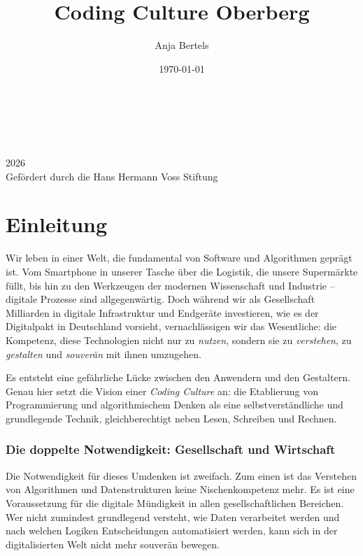 \documentclass[a5paper,pagesize,10pt,bibtotoc,pointlessnumbers,
normalheadings,DIV=9,twoside=false]{scrbook}
\title{Coding Culture Oberberg}
\author{Anja Bertels}
\date{\today}
\begin{document}
\begin{titlepage}
		\\
			
		\vspace{10mm}
		\\
        \\
		\vspace{\fill}
		\centering \large{2026}\\
        \centering \small{Gefördert durch die Hans Hermann Voss Stiftung}
\end{titlepage}


\newpage{}

\chapter{Einleitung}

Wir leben in einer Welt, die fundamental von Software und Algorithmen geprägt ist. Vom Smartphone in unserer Tasche über die Logistik, die unsere Supermärkte füllt, bis hin zu den Werkzeugen der modernen Wissenschaft und Industrie -- digitale Prozesse sind allgegenwärtig. Doch während wir als Gesellschaft Milliarden in digitale Infrastruktur und Endgeräte investieren, wie es der Digitalpakt in Deutschland vorsieht, vernachlässigen wir das Wesentliche: die Kompetenz, diese Technologien nicht nur zu \textit{nutzen}, sondern sie zu \textit{verstehen}, zu \textit{gestalten} und \textit{souverän} mit ihnen umzugehen.

Es entsteht eine gefährliche Lücke zwischen den Anwendern und den Gestaltern. Genau hier setzt die Vision einer \textit{Coding Culture} an: die Etablierung von Programmierung und algorithmischem Denken als eine selbstverständliche und grundlegende Technik, gleichberechtigt neben Lesen, Schreiben und Rechnen.

\subsection*{Die doppelte Notwendigkeit: Gesellschaft und Wirtschaft}

Die Notwendigkeit für dieses Umdenken ist zweifach. Zum einen ist das Verstehen von Algorithmen und Datenstrukturen keine Nischenkompetenz mehr. Es ist eine Voraussetzung für die digitale Mündigkeit in allen gesellschaftlichen Bereichen. Wer nicht zumindest grundlegend versteht, wie Daten verarbeitet werden und nach welchen Logiken Entscheidungen automatisiert werden, kann sich in der digitalisierten Welt nicht mehr souverän bewegen.
\end{document}
